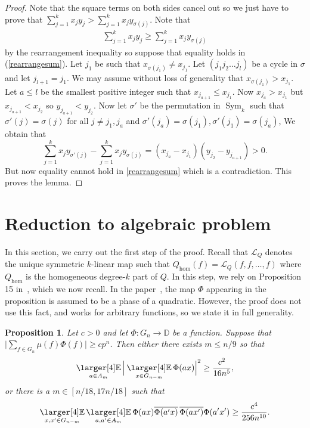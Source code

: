 \documentclass[a4paper,11pt]{article}
\newtheorem{proposition}[theorem]{Proposition}
\theoremstyle{definition}
\newcommand{\on}[1]{
	\operatorname{#1}
}
\newcommand{\exx}{
  \mathop{
    \mathchoice{\vcenter{\hbox{\larger[4]$\mathbb{E}$}}}
               {\kern0pt\mathbb{E}}
               {\kern0pt\mathbb{E}}
               {\kern0pt\mathbb{E}}
  }\displaylimits
}
\begin{document}
\begin{proof}
    Note that the square terms on both sides cancel out so we just have to prove that $\sum_{j=1}^k x_jy_j>\sum_{j=1}^k x_jy_{\sigma(j)}$. Note that \begin{align}\label{rearrangesum}\sum_{j=1}^k x_jy_j\ge \sum_{j=1}^k x_jy_{\sigma(j)}
    \end{align}by the rearrangement inequality so suppose that equality holds in (\ref{rearrangesum}). Let $j_1$ be such that $x_{\sigma(j_1)}\neq x_{j_1}$. Let $(j_1j_2\ldots j_l)$ be a cycle in $\sigma$ and let $j_{l+1}=j_1$. We may assume without loss of generality that $x_{\sigma(j_1)}> x_{j_1}$. Let $a\le l$ be the smallest positive integer such that $x_{j_{a+1}}\le x_{j_1}$. Now $x_{j_a} > x_{j_1}$ but $x_{j_{a+1}}<x_{j_2}$ so $y_{j_{a+1}}<y_{j_2}$. Now let $\sigma'$ be the permutation in $\on{Sym}_k$ such that $\sigma'(j)=\sigma(j)$ for all $j\neq j_1,j_a$ and $\sigma'(j_a)=\sigma(j_1),\sigma'(j_1)=\sigma(j_a)$, We obtain that $$\sum_{j = 1}^k x_jy_{\sigma'(j)}-\sum_{j = 1}^k x_jy_{\sigma(j)}=(x_{j_a}-x_{j_1})(y_{j_2}-y_{j_{a+1}})>0.$$ But now equality cannot hold in \eqref{rearrangesum} which is a contradiction. This proves the lemma.
\end{proof}

\section{Reduction to algebraic problem}

In this section, we carry out the first step of the proof. Recall that $\mathcal{L}_Q$ denotes the unique symmetric $k$-linear map such that $Q_{\on{hom}}(f) = \mathcal{L}_Q(f,f,\ldots ,f)$ where $Q_{\on{hom}}$ is the homogeneous degree-$k$ part of $Q$. In this step, we rely on Proposition 15 in~\cite{BL}, which we now recall. In the paper~\cite{BL}, the map $\Phi$ appearing in the proposition is assumed to be a phase of a quadratic. However, the proof does not use this fact, and works for arbitrary functions, so we state it in full generality.

\begin{proposition}\label{bienvenulestep1}
    Let $c > 0$ and let $\Phi : G_n \to \mathbb{D}$ be a function. Suppose that $\Big|\sum_{f\in G_n}\mu(f)\Phi(f)\Big| \geq c p^n$. Then either there exists $m \leq n/9$ so that
    \[\exx_{a \in A_m} \Big|\exx_{x \in G_{n- m}} \Phi(ax)\Big|^2 \geq \frac{c^2}{16n^5},\]
    or there is a $m \in [n/18, 17n/18]$ such that
    \[\exx_{x, x' \in G_{n - m}} \exx_{a,a' \in A_m} \Phi(ax)\overline{\Phi(a'x)}\,\overline{\Phi(ax')}\Phi(a'x') \geq \frac{c^4}{256n^{10}}.\]
\end{proposition}
\end{document}
